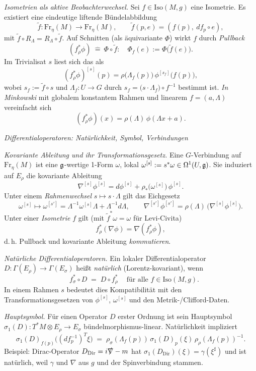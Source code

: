 \documentclass[10pt, letterpaper]{article}
\newcommand{\Iso}{\mathrm{Iso}}
\begin{document}
\emph{Isometrien als aktive Beobachterwechsel.}
Sei $f\in\Iso(M,g)$ eine Isometrie. Es existiert eine eindeutige liftende Bündelabbildung
\[
\tilde f:\mathrm{Fr}_\eta(M)\to \mathrm{Fr}_\eta(M),\qquad \tilde f(p,e)=(f(p),\ d f_p\circ e),
\]
mit $\tilde f\circ R_\Lambda=R_\Lambda\circ \tilde f$.
Auf Schnitten (als äquivariante $\Phi$) wirkt $f$ durch \emph{Pullback}
\[
(f^*_\rho\phi)\ \widehat{=}\ \Phi\circ \tilde f:\quad
\Phi_f(e):=\Phi\!\big(\tilde f(e)\big).
\]
Im Trivialisat $s$ liest sich das als
\[
(f^*_\rho\phi)^{[s]}(p)
=\rho\!\big(\Lambda_f(p)\big)\,\phi^{[s_f]}\!\big(f(p)\big),
\]
wobei $s_f:=\tilde f\circ s$ und $\Lambda_f:U\to G$ durch $s_f=\big(s\cdot\Lambda_f\big)\circ f^{-1}$ bestimmt ist.
\emph{In Minkowski} mit globalem konstantem Rahmen und linearem $f=(a,\Lambda)$ vereinfacht sich
\[
(f^*_\rho\phi)(x)=\rho(\Lambda)\,\phi(\Lambda x + a).
\]

\emph{Differentialoperatoren: Natürlichkeit, Symbol, Verbindungen}

\emph{Kovariante Ableitung und ihr Transformationsgesetz.}
Eine $G$-Verbindung auf $\mathrm{Fr}_\eta(M)$ ist eine $\frak g$-wertige 1-Form $\omega$,
lokal $\omega^{[s]}:=s^*\omega\in\Omega^1(U,\frak g)$.
Sie induziert auf $E_\rho$ die kovariante Ableitung
\[
\nabla^{[s]}\phi^{[s]}=d\phi^{[s]}+\rho_*\!\big(\omega^{[s]}\big)\,\phi^{[s]}.
\]
Unter einem \emph{Rahmenwechsel} $s\mapsto s\cdot\Lambda$ gilt das Eichgesetz
\[
\omega^{[s]}\mapsto \omega^{[s']}=\Lambda^{-1}\omega^{[s]}\Lambda+\Lambda^{-1}d\Lambda,
\qquad
\nabla^{[s']}\phi^{[s']}=\rho(\Lambda)\,\big(\nabla^{[s]}\phi^{[s]}\big).
\]
Unter einer \emph{Isometrie} $f$ gilt (mit $\tilde f^*\omega=\omega$ für Levi-Civita)
\[
f_\rho^*(\nabla\phi)=\nabla(f_\rho^*\phi),
\]
d.\,h. Pullback und kovariante Ableitung \emph{kommutieren}.

\emph{Natürliche Differentialoperatoren.}
Ein lokaler Differentialoperator $D:\Gamma(E_\rho)\to\Gamma(E_\sigma)$ heißt \emph{natürlich} (Lorentz-kovariant), wenn
\[
\boxed{\quad f^*_\sigma\circ D \;=\; D\circ f^*_\rho \quad\ \text{für alle }f\in\Iso(M,g).}
\]
In einem Rahmen $s$ bedeutet dies Kompatibilität mit den Transformationsgesetzen von
$\phi^{[s]}$, $\omega^{[s]}$ und den Metrik-/Clifford-Daten.

\emph{Hauptsymbol.}
Für einen Operator $D$ erster Ordnung ist sein Hauptsymbol $\sigma_1(D):T^*M\otimes E_\rho\to E_\sigma$
bündelmorphismus-linear. Natürlichkeit impliziert
\[
\sigma_1(D)_{f(p)}\big((d f_p^{-1})^T\xi\big)
\;=\; \rho_\sigma(\Lambda_f(p))\,\sigma_1(D)_p(\xi)\,\rho_\rho(\Lambda_f(p))^{-1}.
\]
Beispiel: Dirac-Operator $D_{\text{Dir}}=i\slashed{\nabla}-m$ hat
$\sigma_1(D_{\text{Dir}})(\xi)=\gamma(\xi^\sharp)$ und ist natürlich, weil
$\gamma$ und $\nabla$ aus $g$ und der Spinverbindung stammen.
\end{document}
